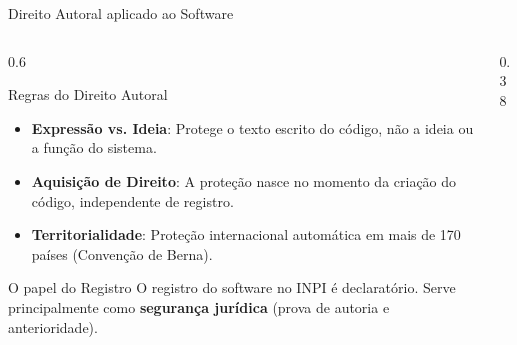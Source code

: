 \documentclass[9pt]{beamer}
\begin{document}
\begin{frame}{Direito Autoral aplicado ao Software}
  \begin{columns}[T]
    \begin{column}{0.6\textwidth}
      \begin{block}{Regras do Direito Autoral}
        \small
        \begin{itemize}
          \item \textbf{Expressão vs. Ideia}: Protege o texto escrito do código, não a ideia ou a função do sistema.
          \item \textbf{Aquisição de Direito}: A proteção nasce no momento da criação do código, independente de registro.
          \item \textbf{Territorialidade}: Proteção internacional automática em mais de 170 países (Convenção de Berna).
        \end{itemize}
      \end{block}
      \begin{block}{O papel do Registro}
        \small
        O registro do software no INPI é declaratório. Serve principalmente como \textbf{segurança jurídica} (prova de autoria e anterioridade).
      \end{block}
    \end{column}
    
    \begin{column}{0.38\textwidth}
      \vspace{0.5cm}
      \begin{center}
      \end{center}
    \end{column}
  \end{columns}
\end{frame}
\end{document}

